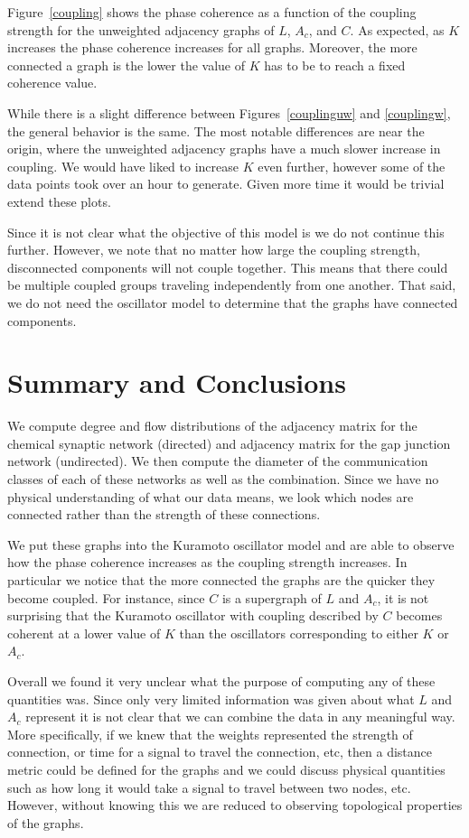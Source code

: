 \documentclass[10pt]{article}
\begin{document}
Figure~\ref{coupling} shows the phase coherence as a function of the coupling strength for the unweighted adjacency graphs of \( L \), \( A_c \), and \( C \). As expected, as \( K \) increases the phase coherence increases for all graphs. Moreover, the more connected a graph is the lower the value of \( K \) has to be to reach a fixed coherence value.

While there is a slight difference between Figures~\ref{couplinguw} and \ref{couplingw}, the general behavior is the same. The most notable differences are near the origin, where the unweighted adjacency graphs have a much slower increase in coupling. 
We would have liked to increase \( K \) even further, however some of the data points took over an hour to generate. Given more time it would be trivial extend these plots.

Since it is not clear what the objective of this model is we do not continue this further. However, we note that no matter how large the coupling strength, disconnected components will not couple together. This means that there could be multiple coupled groups traveling independently from one another. That said, we do not need the oscillator model to determine that the graphs have connected components.


\section{Summary and Conclusions}
We compute degree and flow distributions of the adjacency matrix for the chemical synaptic network (directed) and adjacency matrix for the gap junction network (undirected). We then compute the diameter of the communication classes of each of these networks as well as the combination. Since we have no physical understanding of what our data means, we look which nodes are connected rather than the strength of these connections.

We put these graphs into the Kuramoto oscillator model and are able to observe how the phase coherence increases as the coupling strength increases. In particular we notice that the more connected the graphs are the quicker they become coupled. For instance, since \( C \) is a supergraph of \( L \) and \( A_c \), it is not surprising that the Kuramoto oscillator with coupling described by \( C \) becomes coherent at a lower value of \( K \) than the oscillators corresponding to either \( K \) or \( A_c \).

Overall we found it very unclear what the purpose of computing any of these quantities was. Since only very limited information was given about what \( L \) and \( A_c \) represent it is not clear that we can combine the data in any meaningful way. More specifically, if we knew that the weights represented the strength of connection, or time for a signal to travel the connection, etc, then a distance metric could be defined for the graphs and we could discuss physical quantities such as how long it would take a signal to travel between two nodes, etc. However, without knowing this we are reduced to observing topological properties of the graphs.
\end{document}
